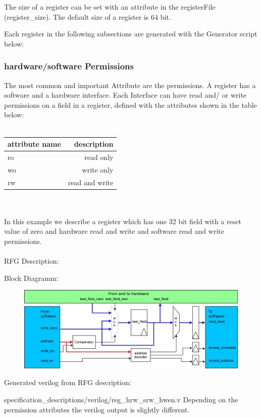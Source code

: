 \documentclass[12pt,a4paper]{article}
\begin{document}
The size of a register can be set with an attribute in the registerFile (register\_size). The default size of a register is 64 bit.

Each register in the following subsections are generated with the Generator script below:



\newpage

\subsubsection{hardware/software Permissions}

The most common and important Attribute are the permissions. A register has a software and a hardware interface. Each Interface can have read and/ or write permissions on a field in a register, defined with the attributes shown in the table below:\\
\\
\begin{tabular}{ l | r }
attribute name & description \\ \hline
ro & read only \\ \hline
wo & write only \\ \hline
rw & read and write \\ \hline
\end{tabular}
\\
\\
In this example we describe a register which has one 32 bit field with a reset value of zero and hardware read and write and software read and write permissions.\\
\\
RFG Description:


Block Diagramm:
\begin{figure}[h!]
\includegraphics[width=\textwidth]{pictures/Reg_hrw_srw_hwen.png}
\end{figure}
\newpage
Generated verilog from RFG description:

{specification_descriptions/verilog/reg_hrw_srw_hwen.v}
Depending on the permission attributes the verilog output is slightly different. 
\end{document}

